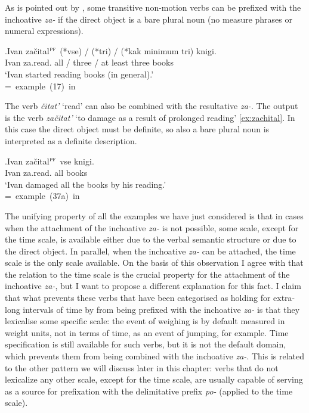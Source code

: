 As is pointed out by \citet[227]{Braginsky:08}, some transitive non-motion verbs can be prefixed with the inchoative \textit{za-} if the direct object is a bare plural noun (no measure phrases or numeral expressions).

\exg.Ivan za\v{c}ital$^{\textsc{pf}}$ (*vse) / (*tri) / (*kak minimum tri) knigi.\\
Ivan za.read. all / three / at least three books\\
\trans `Ivan started reading books (in general).'\\\hbox{}\hfill\hbox{= example (17) in \citealt[227]{Braginsky:08}}

The verb \textit{\v{c}itat'} `read' can also be combined with the resultative \textit{za-}. The output is the verb \textit{za\v{c}itat'} `to damage as a result of prolonged reading' \ref{ex:zachital}. In this case the direct object must be definite, so also a bare plural noun is interpreted as a definite description.

\exg.\label{ex:zachital}Ivan za\v{c}ital$^{\textsc{pf}}$ vse knigi.\\
Ivan za.read. all books\\
`Ivan damaged all the books by his reading.'\\\hbox{}\hfill\hbox{= example (37a) in \citealt[246]{Braginsky:08}}

The unifying property of all the examples we have just considered is that in cases when the attachment of the inchoative \textit{za-} is not possible, some scale, except for the time scale, is available either due to the verbal semantic structure or due to the direct object. In parallel, when the inchoative \textit{za-} can be attached, the time scale is the only scale available. On the basis of this observation I agree with \citet{Paducheva:96} that the relation to the time scale is the crucial property for the attachment of the inchoative \textit{za-}, but I want to propose a different explanation for this fact. I claim that what prevents these verbs that have been categorised as holding for extra-long intervals of time by \citet{Paducheva:96} from being prefixed with the inchoative \textit{za-} is that they lexicalise some specific scale: the event of weighing is by default measured in weight units, not in terms of time, as an event of jumping, for example. Time specification is still available for such verbs, but it is not the default domain, which prevents them from being combined with the inchoative \textit{za-}. This is related to the other pattern we will discuss later in this chapter: verbs that do not lexicalize any other scale, except for the time scale, are usually capable of serving as a source for prefixation with the delimitative prefix \textit{po-} (applied to the time scale). 

